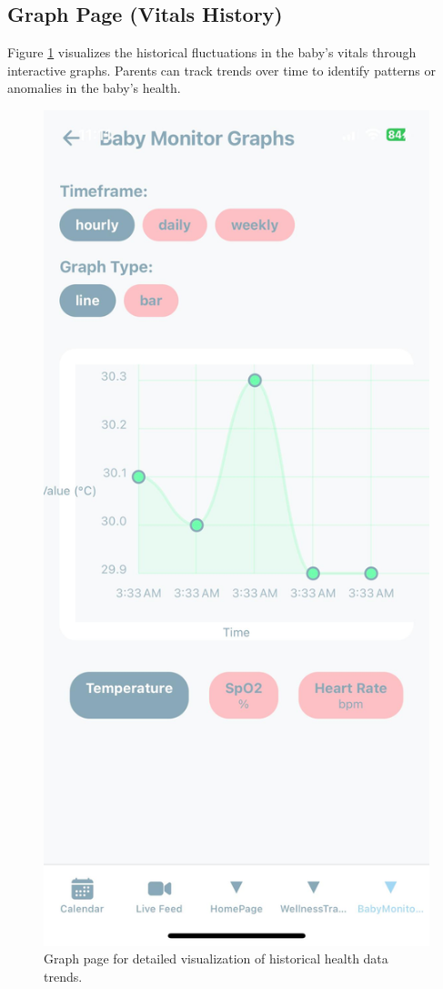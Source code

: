 \documentclass[12pt,a4paper]{report}
\begin{document}
\subsection{Graph Page (Vitals History)}
Figure \ref{fig:graph} visualizes the historical fluctuations in the baby’s vitals through interactive graphs. Parents can track trends over time to identify patterns or anomalies in the baby's health.
\begin{figure}[hbtp]
  \centering
  \includegraphics[scale=0.1]{./pic/graphs.jpeg}
  \caption{Graph page for detailed visualization of historical health data trends.}
  \label{fig:graph}
\end{figure}
\end{document}
